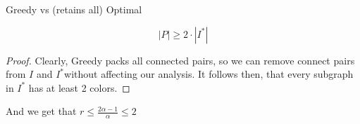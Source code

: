 \begin{frame}{Greedy vs (retains all) Optimal}
	
\begin{lemma}
$$ |P| \geq 2 \cdot |I^*| $$
\end{lemma}

\begin{proof}
Clearly, Greedy packs all connected pairs, so we can remove connect pairs 
from $I$ and $I^*$without affecting our analysis. 
It follows then, that every subgraph in $I^*$ has at least 2 colors. 
\end{proof}

And we get that $r \leq \frac{2 \alpha - 1}{\alpha} \leq 2$


\end{frame}

